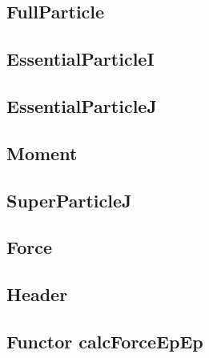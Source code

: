 \subsection{FullParticle}
\label{sec:fullparticle}



\subsection{EssentialParticleI}
\label{sec:essentialparticlei}



\subsection{EssentialParticleJ}
\label{sec:essentialparticlej}



\subsection{Moment}
\label{sec:moment}



\subsection{SuperParticleJ}
\label{sec:superparticlej}



\subsection{Force}
\label{sec:force}



\subsection{Header}
\label{sec:userdefined_header}



\subsection{Functor calcForceEpEp}
\label{sec:userdefined_calcForceEpEp}




